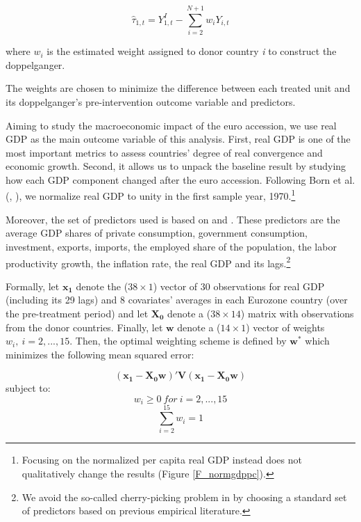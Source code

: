 \documentclass[12pt]{article}
\renewcommand{\vec}[1]{\mathbf{#1}}
\begin{document}
\begin{equation}
\label{EQ_objective}
    \hat{\tau}_{1,t} = Y_{1,t}^I - \sum\limits_{i=2}^{N+1} w_i Y_{i,t}
\end{equation}

where $w_i$ is the estimated weight assigned to donor country \textit{i} to construct the doppelganger.

The weights are chosen to minimize the difference between each treated unit and its doppelganger's pre-intervention outcome variable and predictors. 

Aiming to study the macroeconomic impact of the euro accession, we use real GDP as the main outcome variable of this analysis. First, real GDP is one of the most important metrics to assess countries' degree of real convergence and economic growth. Second, it allows us to unpack the baseline result by studying how each GDP component changed after the euro accession. Following Born et al. (\citeyear{Born2018}, \citeyear{Born2019}), we normalize real GDP to unity in the first sample year, 1970.\footnote{Focusing on the normalized per capita real GDP instead does not qualitatively change the results (Figure \ref{F_normgdppc}).}  

Moreover, the set of predictors used is based on \cite{Abadie2003} and \cite{Born2019}. These predictors are the average GDP shares of private consumption, government consumption, investment, exports, imports, the employed share of the population, the labor productivity growth, the inflation rate, the real GDP and its lags.\footnote{We avoid the so-called cherry-picking problem in \cite{Ferman2017} by choosing a standard set of predictors based on previous empirical literature.}

Formally, let $\vec{x_1}$ denote the ($38 \times 1$) vector of $30$ observations for real GDP (including its 29 lags) and $8$ covariates' averages in each Eurozone country (over the pre-treatment period) and let $\vec{X_0}$ denote a ($38 \times 14$) matrix with observations from the donor countries. Finally, let $\vec{w}$ denote a ($14 \times 1$) vector of weights $w_i, \ i=2,...,15$. Then, the optimal weighting scheme is defined by $\vec{w^*}$ which minimizes the following mean squared error:

\begin{equation}
    \label{EQ_min}
    (\vec{x_1}-\vec{X_0}\vec{w})'\vec{V}(\vec{x_1}-\vec{X_0}\vec{w})
\end{equation}
\indent subject to:
\begin{equation}
    w_i \geq 0 \ for \ i=2,...,15
\end{equation}
\begin{equation}
    \sum_{i=2}^{15} w_i = 1
\end{equation}
\end{document}
